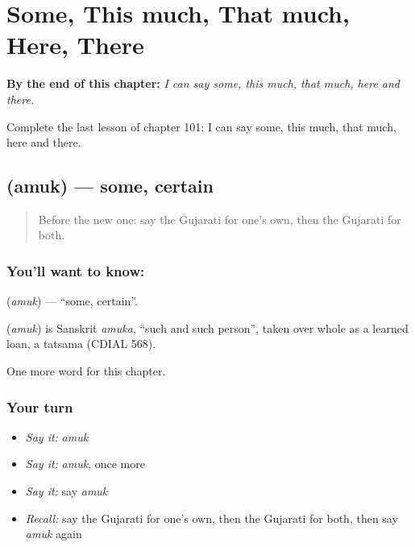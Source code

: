
\chapter{Some, This much, That much, Here, There}
\label{ch:gu-some-this-much-that-much-here-there}

\begin{chapteropening}
\textbf{By the end of this chapter:} \emph{I can say some, this much, that much, here and there.}

Complete the last lesson of chapter 101: I can say some, this much, that much, here and there.
\end{chapteropening}

\section[\texorpdfstring{\gu{અમુક} (amuk)}{અમુક (amuk)}]{ (amuk) — some, certain}

\label{lesson:GU-C101-amuk}



\begin{quote}
Before the new one: say the Gujarati for one's own, then the Gujarati for both.
\end{quote}

\subsection*{You'll want to know: }
\textbf{} (\emph{amuk}) — \textquotedblleft{}some, certain\textquotedblright{}.

\begin{cousinweb}
\textbf{} (\emph{amuk}) is Sanskrit \emph{amuka}, \textquotedblleft{}such and such person\textquotedblright{}, taken over whole as a learned loan, a tatsama (CDIAL 568).
\end{cousinweb}

\begin{grammarlens}[title={What you've built}]
One more word for this chapter.
\end{grammarlens}

\subsection*{Your turn}
\begin{itemize}
\raggedright
  \item \emph{Say it:} \emph{amuk}
  \item \emph{Say it:} \emph{amuk}, once more
  \item \emph{Say it:} say \emph{amuk}
  \item \emph{Recall:} say the Gujarati for one's own, then the Gujarati for both, then say \emph{amuk} again
\end{itemize}

